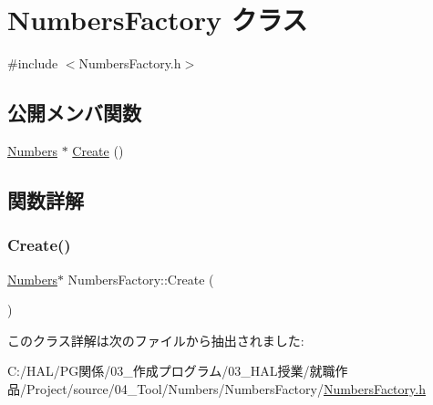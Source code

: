 \hypertarget{class_numbers_factory}{}\section{Numbers\+Factory クラス}
\label{class_numbers_factory}


{\ttfamily \#include $<$Numbers\+Factory.\+h$>$}

\subsection*{公開メンバ関数}
\begin{DoxyCompactItemize}
\item 
\mbox{\hyperlink{class_numbers}{Numbers}} $\ast$ \mbox{\hyperlink{class_numbers_factory_a2d2d0ae4f2d27c25cc73989b64d78c77}{Create}} ()
\end{DoxyCompactItemize}


\subsection{関数詳解}
\mbox{\label{class_numbers_factory_a2d2d0ae4f2d27c25cc73989b64d78c77}} 
\subsubsection{\texorpdfstring{Create()}{Create()}}
{\footnotesize\ttfamily \mbox{\hyperlink{class_numbers}{Numbers}}$\ast$ Numbers\+Factory\+::\+Create (\begin{DoxyParamCaption}{ }\end{DoxyParamCaption})\hspace{0.3cm}{\ttfamily [inline]}}



このクラス詳解は次のファイルから抽出されました\+:\begin{DoxyCompactItemize}
\item 
C\+:/\+H\+A\+L/\+P\+G関係/03\+\_\+作成プログラム/03\+\_\+\+H\+A\+L授業/就職作品/\+Project/source/04\+\_\+\+Tool/\+Numbers/\+Numbers\+Factory/\mbox{\hyperlink{_numbers_factory_8h}{Numbers\+Factory.\+h}}\end{DoxyCompactItemize}
